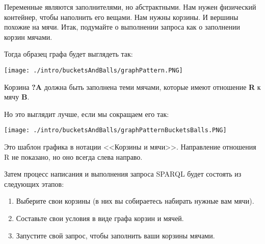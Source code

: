 Переменные являются заполнителями, но абстрактными. Нам нужен физический контейнер, чтобы наполнить его вещами. Нам нужны корзины. И вершины похожие на мячи. Итак, подумайте о выполнении запроса как о заполнении корзин мячами.

Тогда образец графа будет выглядеть так:
\begin{figure*}[h]
\texttt{[image: ./intro/bucketsAndBalls/graphPattern.PNG]}
\end{figure*}

Корзина \textbf{?A} должна быть заполнена теми мячами, которые имеют отношение \textbf{R} к мячу \textbf{B}.

Но это выглядит лучше, если мы сокращаем его так:
\begin{figure*}[h]
\texttt{[image: ./intro/bucketsAndBalls/graphPatternBucketsBalls.PNG]}
\end{figure*}

Это шаблон графика в нотации <<Корзины и мячи>>. Направление отношения R не показано, но оно всегда слева направо.

Затем процесс написания и выполнения запроса SPARQL будет состоять из следующих этапов:
\begin{enumerate}
    \item Выберите свои корзины (в них вы собираетесь набирать нужные вам мячи).
    \item Составьте свои условия в виде графа корзин и мячей.
    \item Запустите свой запрос, чтобы заполнить ваши корзины мячами.
\end{enumerate}
